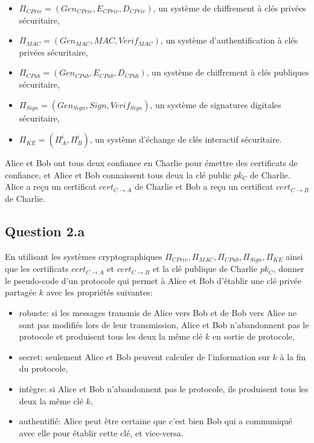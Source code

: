 \documentclass[12pt]{article}
\begin{document}
\begin{itemize}
	\item $\Pi_{CPriv} = (Gen_{CPriv}, E_{CPriv}, D_{CPriv})$, un système de chiffrement à clés privées sécuritaire,
	\item $\Pi_{MAC} = (Gen_{MAC}, MAC, Verif_{MAC})$, un système d'authentification à clés privées sécuritaire,
	\item $\Pi_{CPub} = (Gen_{CPub}, E_{CPub}, D_{CPub})$, un système de chiffrement à clés publiques sécuritaire,
	\item $\Pi_{Sign} = (Gen_{Sign}, Sign, Verif_{Sign})$, un système de signatures digitales sécuritaire,
	\item $\Pi_{KE} =  (\Pi_A^i, \Pi_B^i)$, un système d'échange de clés interactif sécuritaire.
\end{itemize}

Alice et Bob ont tous deux confiance en Charlie pour émettre des certificats de confiance, et Alice et Bob connaissent tous deux la clé public $pk_C$ de Charlie. Alice a reçu un certificat $cert_{C \rightarrow A}$ de Charlie et Bob a reçu un certificat $cert_{C \rightarrow B}$ de Charlie.



\subsection{Question 2.a}

En utilisant les systèmes cryptographiques  $\Pi_{CPriv}, \Pi_{MAC},  \Pi_{CPub},  \Pi_{Sign}, \Pi_{KE}$ ainsi que les certificats $cert_{C \rightarrow A}$ et $cert_{C \rightarrow B}$ et la clé publique de Charlie $pk_C$, donner le pseudo-code d'un protocole qui permet à Alice et Bob d'établir une clé privée partagée $k$ avec les propriétés suivantes:
\begin{itemize}
	\item robuste: si les messages transmis de Alice vers Bob et de Bob vers Alice ne sont pas modifiés lors de leur transmission, Alice et Bob n'abandonnent pas le protocole et produisent tous les deux la même clé $k$ en sortie de protocole,
	\item secret: seulement Alice et Bob peuvent calculer de l'information sur $k$ à la fin du protocole,
	\item intègre: si Alice et Bob n'abandonnent pas le protocole, ils produisent tous les deux la même clé $k$,
	\item authentifié: Alice peut être certaine que c'est bien Bob qui a communiqué avec elle pour établir cette clé, et vice-versa.
\end{itemize}
\end{document}
